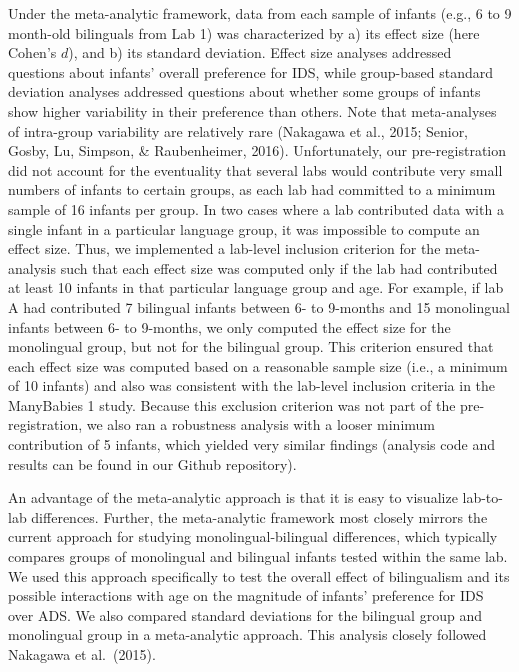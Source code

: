 \documentclass[
  english,
  ,man,floatsintext]{apa6}
\begin{document}
Under the meta-analytic framework, data from each sample of infants (e.g., 6 to 9 month-old bilinguals from Lab 1) was characterized by a) its effect size (here Cohen's \(d\)), and b) its standard deviation. Effect size analyses addressed questions about infants' overall preference for IDS, while group-based standard deviation analyses addressed questions about whether some groups of infants show higher variability in their preference than others. Note that meta-analyses of intra-group variability are relatively rare (Nakagawa et al., 2015; Senior, Gosby, Lu, Simpson, \& Raubenheimer, 2016). Unfortunately, our pre-registration did not account for the eventuality that several labs would contribute very small numbers of infants to certain groups, as each lab had committed to a minimum sample of 16 infants per group. In two cases where a lab contributed data with a single infant in a particular language group, it was impossible to compute an effect size. Thus, we implemented a lab-level inclusion criterion for the meta-analysis such that each effect size was computed only if the lab had contributed at least 10 infants in that particular language group and age. For example, if lab A had contributed 7 bilingual infants between 6- to 9-months and 15 monolingual infants between 6- to 9-months, we only computed the effect size for the monolingual group, but not for the bilingual group. This criterion ensured that each effect size was computed based on a reasonable sample size (i.e., a minimum of 10 infants) and also was consistent with the lab-level inclusion criteria in the ManyBabies 1 study. Because this exclusion criterion was not part of the pre-registration, we also ran a robustness analysis with a looser minimum contribution of 5 infants, which yielded very similar findings (analysis code and results can be found in our Github repository).

An advantage of the meta-analytic approach is that it is easy to visualize lab-to-lab differences. Further, the meta-analytic framework most closely mirrors the current approach for studying monolingual-bilingual differences, which typically compares groups of monolingual and bilingual infants tested within the same lab. We used this approach specifically to test the overall effect of bilingualism and its possible interactions with age on the magnitude of infants' preference for IDS over ADS. We also compared standard deviations for the bilingual group and monolingual group in a meta-analytic approach. This analysis closely followed Nakagawa et al.~(2015).
\end{document}
